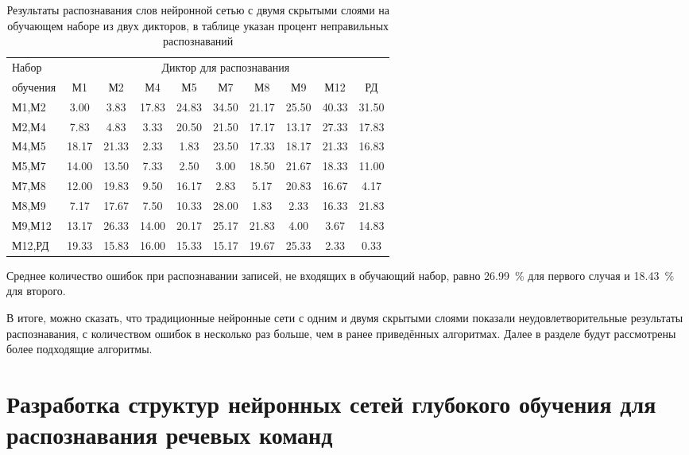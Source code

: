 \begin{table}[h]
	\centering
	\caption{Результаты распознавания слов нейронной сетью с двумя скрытыми слоями на обучающем наборе из двух дикторов, в таблице указан процент неправильных распознаваний}
	\label{tab:mlp2_dictor2}
	\begin{tabular}{| l | c | c | c | c | c | c | c | c | c |}
		\hline
		Набор & \multicolumn{9}{c|}{Диктор для распознавания} \\
		\hhline{~---------}
		обучения \phantom{0000} & М1      & М2    	 & М4      & М5    	 & М7      & М8    	 & М9      & М12   	 & РД \\
		\hline
		М1,М2	 &  3.00 &  3.83 & 17.83 & 24.83 & 34.50 & 21.17 & 25.50 & 40.33 & 31.50 \\
		М2,М4	 &  7.83 &  4.83 &  3.33 & 20.50 & 21.50 & 17.17 & 13.17 & 27.33 & 17.83 \\
		М4,М5	 & 18.17 & 21.33 &  2.33 &  1.83 & 23.50 & 17.33 & 18.17 & 21.33 & 16.83 \\
		М5,М7	 & 14.00 & 13.50 &  7.33 &  2.50 &  3.00 & 18.50 & 21.67 & 18.33 & 11.00 \\
		М7,М8	 & 12.00 & 19.83 &  9.50 & 16.17 &  2.83 &  5.17 & 20.83 & 16.67 &  4.17 \\
		М8,М9	 &  7.17 & 17.67 &  7.50 & 10.33 & 28.00 &  1.83 &  2.33 & 16.33 & 21.83 \\
		М9,М12	 & 13.17 & 26.33 & 14.00 & 20.17 & 25.17 & 21.83 &  4.00 &  3.67 & 14.83 \\
		М12,РД	 & 19.33 & 15.83 & 16.00 & 15.33 & 15.17 & 19.67 & 25.33 &  2.33 &  0.33 \\
		\hline
	\end{tabular}
\end{table}

Среднее количество ошибок при распознавании записей, не входящих в обучающий набор, равно 26.99~\% для первого случая и 18.43~\% для второго.

В итоге, можно сказать, что традиционные нейронные сети с одним и двумя скрытыми слоями показали неудовлетворительные результаты распознавания, с количеством ошибок в несколько раз больше, чем в ранее приведённых алгоритмах.
Далее в разделе будут рассмотрены более подходящие алгоритмы.

\clearpage


\section{Разработка структур нейронных сетей глубокого обучения для распознавания речевых команд} \label{sect4_2}

